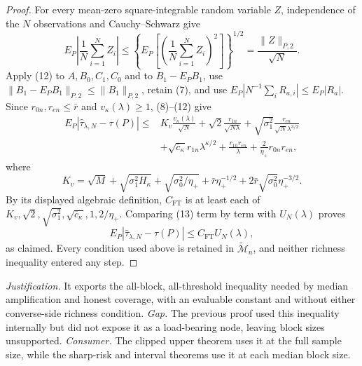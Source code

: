 \documentclass{article}
\begin{document}
\begin{proof}
For every mean-zero square-integrable random variable \(Z\), independence of
the \(N\) observations and Cauchy--Schwarz give
\[
E_P\left|\frac1N\sum_{i=1}^NZ_i\right|
\leq\left\{E_P\left[\left(\frac1N\sum_{i=1}^NZ_i\right)^2\right]\right\}^{1/2}
=\frac{\|Z\|_{P,2}}{\sqrt N}.                                     \tag{12}
\]
Apply (12) to \(A,B_0,C_1,C_0\) and to \(B_1-E_PB_1\), use
\(\|B_1-E_PB_1\|_{P,2}\leq\|B_1\|_{P,2}\), retain (7), and use
\(E_P|N^{-1}\sum_iR_{a,i}|\leq E_P|R_a|\).  Since
\(r_{0n},r_{en}\leq\bar r\) and \(v_\kappa(\lambda)\geq1\),
(8)--(12) give
\[
\begin{split}
E_P|\widehat\tau_{\lambda,N}-\tau(P)|
\leq{}&K_v\frac{v_\kappa(\lambda)}{\sqrt N}
+\sqrt2\frac{r_{1n}}{\sqrt{N\lambda}}
+\sqrt{\sigma_1^2}\frac{r_{en}}{\sqrt N\lambda^{3/2}}\\
&+\sqrt{\overline c_\kappa}r_{1n}\lambda^{\kappa/2}
+\frac{r_{1n}r_{en}}\lambda
+\frac2{\eta_+}r_{0n}r_{en},
\end{split} \tag{13}
\]
where
\[
K_v=\sqrt M+\sqrt{\sigma_1^2H_\kappa}
+\sqrt{\sigma_0^2/\eta_+}
+\bar r\eta_+^{-1/2}
+2\bar r\sqrt{\sigma_0^2}\eta_+^{-3/2}.
\]
By its displayed algebraic definition, \(C_{\mathrm{FT}}\) is at least each
of \(K_v,\sqrt2,\sqrt{\sigma_1^2},
\sqrt{\overline c_\kappa},1,2/\eta_+\).  Comparing (13) term by term with
\(U_N(\lambda)\) proves
\[
E_P|\widehat\tau_{\lambda,N}-\tau(P)|
\leq C_{\mathrm{FT}}U_N(\lambda),
\]
as claimed.  Every condition used above is retained in
\(\widetilde{\mathcal M}_n\), and neither richness inequality entered any
step.
\end{proof}
\par\smallskip\noindent \textit{Justification.} It exports the all-block, all-threshold inequality needed by median amplification and honest coverage, with an evaluable constant and without either converse-side richness condition. \textit{Gap.} The previous proof used this inequality internally but did not expose it as a load-bearing node, leaving block sizes unsupported. \textit{Consumer.} The clipped upper theorem uses it at the full sample size, while the sharp-risk and interval theorems use it at each median block size.
\end{document}

